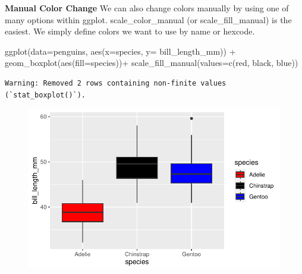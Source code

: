 \documentclass[
  letterpaper,
  DIV=11,
  numbers=noendperiod]{scrartcl}
\newenvironment{Shaded}{\begin{snugshade}}{\end{snugshade}}
\newcommand{\AttributeTok}[1]{\textcolor[rgb]{0.40,0.45,0.13}{#1}}
\newcommand{\FunctionTok}[1]{\textcolor[rgb]{0.28,0.35,0.67}{#1}}
\newcommand{\NormalTok}[1]{\textcolor[rgb]{0.00,0.23,0.31}{#1}}
\newcommand{\SpecialCharTok}[1]{\textcolor[rgb]{0.37,0.37,0.37}{#1}}
\newcommand{\StringTok}[1]{\textcolor[rgb]{0.13,0.47,0.30}{#1}}
\begin{document}
\textbf{Manual Color Change} We can also change colors manually by using
one of many options within ggplot. scale\_color\_manual (or
scale\_fill\_manual) is the easiest. We simply define colors we want to
use by name or hexcode.

\begin{Shaded}
\begin{Highlighting}[]
\FunctionTok{ggplot}\NormalTok{(}\AttributeTok{data=}\NormalTok{penguins, }\FunctionTok{aes}\NormalTok{(}\AttributeTok{x=}\NormalTok{species, }\AttributeTok{y=}\NormalTok{ bill\_length\_mm)) }\SpecialCharTok{+}
  \FunctionTok{geom\_boxplot}\NormalTok{(}\FunctionTok{aes}\NormalTok{(}\AttributeTok{fill=}\NormalTok{species))}\SpecialCharTok{+}
  \FunctionTok{scale\_fill\_manual}\NormalTok{(}\AttributeTok{values=}\FunctionTok{c}\NormalTok{(}\StringTok{\textquotesingle{}red\textquotesingle{}}\NormalTok{, }\StringTok{\textquotesingle{}black\textquotesingle{}}\NormalTok{, }\StringTok{\textquotesingle{}blue\textquotesingle{}}\NormalTok{))}
\end{Highlighting}
\end{Shaded}

\begin{verbatim}
Warning: Removed 2 rows containing non-finite values (`stat_boxplot()`).
\end{verbatim}

\begin{figure}[H]

{\centering \includegraphics{colors_files/figure-pdf/unnamed-chunk-4-1.pdf}

}

\end{figure}
\end{document}
